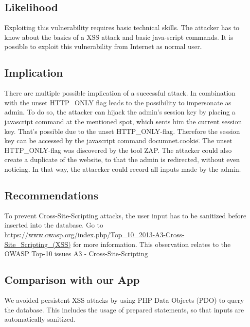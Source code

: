 \subsection{Likelihood}
Exploiting this vulnerability requires basic technical skills. The attacker has to know about the basics of a XSS attack and basic java-script commands. It is possible to exploit this vulnerability from Internet as normal user.

\subsection{Implication}
There are multiple possible implication of a successful attack.  In combination with the unset HTTP\_ONLY flag leads to the possibility to impersonate as admin. To do so, the attacker can hijack the admin's session key by placing a javascript command  at the mentioned spot, which sents him the current session key. That's possible due to the unset HTTP\_ONLY-flag.  Therefore the session key can be accessed by the javascript command \"documnet.cookie\".
The unset HTTP\_ONLY-flag  was discovered by the tool ZAP.
The attacker could also create a duplicate of the website, to that the admin is redirected, without even noticing. In that way, the attaccker could record all inputs made by the admin.



\subsection{Recommendations}
To prevent Cross-Site-Scripting attacks, the user input has to be sanitized before inserted into the database. Go to \url{https://www.owasp.org/index.php/Top_10_2013-A3-Cross-Site_Scripting_(XSS)} for more information. \newline
This observation relates to the OWASP Top-10 issues A3 - Cross-Site-Scripting

\subsection{Comparison with our App}
We avoided persistent XSS attacks by using PHP Data Objects (PDO) to query the database. 
This includes the usage of prepared statements, so that 
inputs are automatically sanitized.